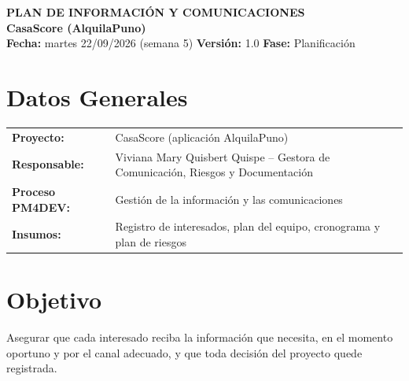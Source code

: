 \documentclass[11pt,a4paper]{article}
\begin{document}
\begin{center}
    {\Large \textbf{\textcolor{AzulUNA}{PLAN DE INFORMACIÓN Y COMUNICACIONES}}}\\[3pt]
    {\normalsize \textbf{CasaScore (AlquilaPuno)}}\\[4pt]
    \footnotesize \textbf{Fecha:} martes 22/09/2026 (semana 5) \quad \textbar\quad \textbf{Versión:} 1.0 \quad \textbar\quad \textbf{Fase:} Planificación
\end{center}

\vspace{0.1cm}

\section{Datos Generales}
\noindent\begin{tabularx}{\textwidth}{@{}P{4.2cm} L@{}}
\toprule
\textbf{Proyecto:} & CasaScore (aplicación AlquilaPuno) \\
\textbf{Responsable:} & Viviana Mary Quisbert Quispe -- Gestora de Comunicación, Riesgos y Documentación \\
\textbf{Proceso PM4DEV:} & Gestión de la información y las comunicaciones \\
\textbf{Insumos:} & Registro de interesados, plan del equipo, cronograma y plan de riesgos \\
\bottomrule
\end{tabularx}

\section{Objetivo}
Asegurar que cada interesado reciba la información que necesita, en el momento oportuno y por el canal adecuado, y que toda decisión del proyecto quede registrada.
\end{document}
